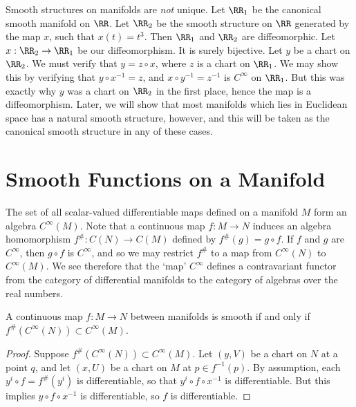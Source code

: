 \begin{example}
    Smooth structures on manifolds are {\it not} unique. Let $\RR_1$ be the canonical smooth manifold on $\RR$. Let $\RR_2$ be the smooth structure on $\RR$ generated by the map $x$, such that $x(t) = t^3$. Then $\RR_1$ and $\RR_2$ are diffeomorphic. Let $x:\RR_2 \to \RR_1$ be our diffeomorphism. It is surely bijective. Let $y$ be a chart on $\RR_2$. We must verify that $y = z \circ x$, where $z$ is a chart on $\RR_1$. We may show this by verifying that $y \circ x^{-1} = z$, and $x \circ y^{-1} = z^{-1}$ is $C^\infty$ on $\RR_1$. But this was exactly why $y$ was a chart on $\RR_2$ in the first place, hence the map is a diffeomorphism. Later, we will show that most manifolds which lies in Euclidean space has a natural smooth structure, however, and this will be taken as the canonical smooth structure in any of these cases.
\end{example}

\section{Smooth Functions on a Manifold}

The set of all scalar-valued differentiable maps defined on a manifold $M$ form an algebra $C^\infty(M)$. Note that a continuous map $f: M \to N$ induces an algebra homomorphism $f^\#: C(N) \to C(M)$ defined by $f^\#(g) = g \circ f$. If $f$ and $g$ are $C^\infty$, then $g \circ f$ is $C^\infty$, and so we may restrict $f^\#$ to a map from $C^\infty(N)$ to $C^\infty(M)$. We see therefore that the `map' $C^\infty$ defines a contravariant functor from the category of differential manifolds to the category of algebras over the real numbers.

\begin{lemma}
    A continuous map $f:M \to N$ between manifolds is smooth if and only if $f^\#(C^\infty(N)) \subset C^\infty(M)$.
\end{lemma}
\begin{proof}
    Suppose $f^\#(C^\infty(N)) \subset C^\infty(M)$. Let $(y,V)$ be a chart on $N$ at a point $q$, and let $(x,U)$ be a chart on $M$ at $p \in f^{-1}(p)$. By assumption, each $y^i \circ f = f^\#(y^i)$ is differentiable, so that $y^i \circ f \circ x^{-1}$ is differentiable. But this implies $y \circ f \circ x^{-1}$ is differentiable, so $f$ is differentiable.
\end{proof}

